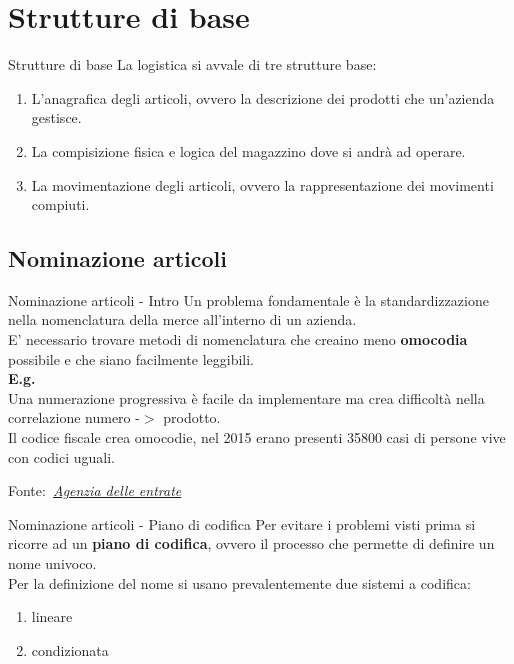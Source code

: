 \documentclass{beamer}
\newcommand{\credit}[1]{\par\hfill \footnotesize Fonte:~\itshape#1}
\begin{document}
    \section{Strutture di base}
    \begin{frame}{Strutture di base}
        La logistica si avvale di tre strutture base:
        \begin{enumerate}
            \item L'anagrafica degli articoli, ovvero la descrizione dei prodotti che un'azienda gestisce.
            \item La compisizione fisica e logica del magazzino dove si andrà ad operare.
            \item La movimentazione degli articoli, ovvero la rappresentazione dei movimenti compiuti.
        \end{enumerate}
    \end{frame}

    \subsection{Nominazione articoli}
    \begin{frame}{Nominazione articoli -  Intro}
        Un problema fondamentale è la standardizzazione nella nomenclatura della merce all'interno di un azienda.\\
        E' necessario trovare metodi di nomenclatura che creaino meno \textbf{omocodia} possibile e che siano facilmente leggibili.\\
        \vspace{1.5em}
        \textbf{E.g.}\\
        Una numerazione progressiva è facile da implementare ma crea difficoltà nella correlazione numero -$>$ prodotto.\\
        Il codice fiscale crea omocodie, nel 2015 erano presenti 35800 casi di persone vive con codici uguali.
        \credit{\href{https://www.agenziaentrate.gov.it/portale/documents/20143/318757/Audizione+del+Direttore+dell+Agenzia+delle+Entrate+10+02+2016_Audizione+-+Codice+Fiscale+e+Omocodie+-+10+feb+2016+df.pdf/202e5395-f622-62e5-219a-7ce894d538a4}{Agenzia delle entrate}}
    \end{frame}

    \begin{frame}{Nominazione articoli - Piano di codifica}
        Per evitare i problemi visti prima si ricorre ad un \textbf{piano di codifica}, ovvero il processo che permette di definire un nome univoco.\\
        Per la definizione del nome si usano prevalentemente due sistemi a codifica:
        \begin{enumerate}
            \item lineare
            \item condizionata
        \end{enumerate}
    \end{frame}
\end{document}
